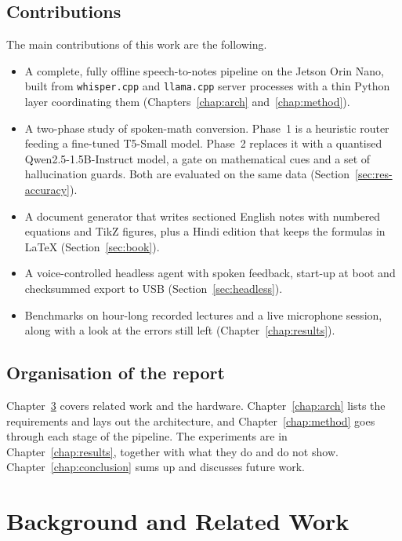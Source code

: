 \documentclass[11pt,a4paper,oneside]{report}
\theoremstyle{definition}
\begin{document}
\section{Contributions}
The main contributions of this work are the following.
\begin{itemize}
  \item A complete, fully offline speech-to-notes pipeline on the Jetson Orin Nano, built from \texttt{whisper.cpp} and \texttt{llama.cpp} server processes with a thin Python layer coordinating them (Chapters~\ref{chap:arch} and~\ref{chap:method}).
  \item A two-phase study of spoken-math conversion. Phase~1 is a heuristic router feeding a fine-tuned T5-Small model. Phase~2 replaces it with a quantised Qwen2.5-1.5B-Instruct model, a gate on mathematical cues and a set of hallucination guards. Both are evaluated on the same data (Section~\ref{sec:res-accuracy}).
  \item A document generator that writes sectioned English notes with numbered equations and TikZ figures, plus a Hindi edition that keeps the formulas in LaTeX (Section~\ref{sec:book}).
  \item A voice-controlled headless agent with spoken feedback, start-up at boot and checksummed export to USB (Section~\ref{sec:headless}).
  \item Benchmarks on hour-long recorded lectures and a live microphone session, along with a look at the errors still left (Chapter~\ref{chap:results}).
\end{itemize}

\section{Organisation of the report}
Chapter~\ref{chap:background} covers related work and the hardware. Chapter~\ref{chap:arch} lists the requirements and lays out the architecture, and Chapter~\ref{chap:method} goes through each stage of the pipeline. The experiments are in Chapter~\ref{chap:results}, together with what they do and do not show. Chapter~\ref{chap:conclusion} sums up and discusses future work.

\chapter{Background and Related Work}
\label{chap:background}
\end{document}
